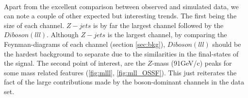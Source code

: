 \\
Apart from the excellent comparison between observed and simulated data, we can note a couple of other expected
but interesting trends. The first being the size of each channel. $Z-jets$ is by far the largest channel followed
by the $Diboson (lll)$. Although $Z-jets$ is the largest channel, by comparing the Feynman-diagrams of each channel
(section \ref{sec:bkg}), $Diboson(lll)$ should be the hardest background to separate due to the similarities in the 
final-states of the signal. The second point of interest, are the $Z$-mass (91GeV/c) peaks for some mass related features
(\ref{fig:mlll}, \ref{fig:mll_OSSF}). This just reiterates the fact of the large contributions made by the boson-dominant 
channels in the data set.
\begin{figure}
\end{figure}
